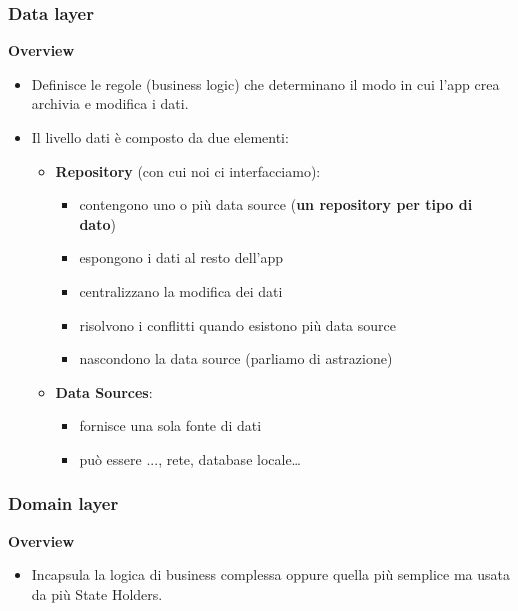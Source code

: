 \subsubsection{Data layer}
\par \textbf{Overview}
\begin{itemize}
    \item Definisce le regole (business logic) che determinano il modo in cui l'app crea archivia e modifica i dati.
    \item Il livello dati è composto da due elementi:
    \begin{itemize}
        \item \textbf{Repository} (con cui noi ci interfacciamo):
        \begin{itemize}
            \item contengono uno o più data source (\textbf{un repository per tipo di dato})
            \item espongono i dati al resto dell'app
            \item centralizzano la modifica dei dati
            \item risolvono i conflitti quando esistono più data source
            \item nascondono la data source (parliamo di astrazione)
        \end{itemize}
        \item \textbf{Data Sources}:
        \begin{itemize}
            \item fornisce una sola fonte di dati
            \item può essere ..., rete, database locale\dots
        \end{itemize}
    \end{itemize}
\end{itemize}

\subsubsection{Domain layer}
\par \textbf{Overview}
\begin{itemize}
    \item Incapsula la logica di business complessa oppure quella più semplice ma usata da più State Holders.
\end{itemize}

